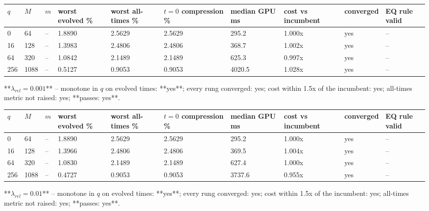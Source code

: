 \documentclass[11pt]{article}
\begin{document}
\begin{table}[htbp]\centering\small
\begin{tabular}{llllllllll}\hline
$q$ & $M$ & $m$ & worst evolved \% & worst all-times \% & $t=0$ compression \% & median GPU ms & cost vs incumbent & converged & EQ rule valid \\ \hline
0 & 64 & -- & 1.8890 & 2.5629 & 2.5629 & 295.2 & 1.000x & yes & -- \\
16 & 128 & -- & 1.3983 & 2.4806 & 2.4806 & 368.7 & 1.002x & yes & -- \\
64 & 320 & -- & 1.0842 & 2.1489 & 2.1489 & 625.3 & 0.997x & yes & -- \\
256 & 1088 & -- & 0.5127 & 0.9053 & 0.9053 & 4020.5 & 1.028x & yes & -- \\
\hline\end{tabular}
\end{table}
**$\lambda_{rel} = 0.001$** -- monotone in $q$ on evolved times: **yes**; every rung converged: yes; cost within 1.5x of the incumbent: yes; all-times metric not raised: yes; **passes: yes**.

\begin{table}[htbp]\centering\small
\begin{tabular}{llllllllll}\hline
$q$ & $M$ & $m$ & worst evolved \% & worst all-times \% & $t=0$ compression \% & median GPU ms & cost vs incumbent & converged & EQ rule valid \\ \hline
0 & 64 & -- & 1.8890 & 2.5629 & 2.5629 & 295.2 & 1.000x & yes & -- \\
16 & 128 & -- & 1.3966 & 2.4806 & 2.4806 & 369.5 & 1.004x & yes & -- \\
64 & 320 & -- & 1.0830 & 2.1489 & 2.1489 & 627.4 & 1.000x & yes & -- \\
256 & 1088 & -- & 0.4727 & 0.9053 & 0.9053 & 3737.6 & 0.955x & yes & -- \\
\hline\end{tabular}
\end{table}
**$\lambda_{rel} = 0.01$** -- monotone in $q$ on evolved times: **yes**; every rung converged: yes; cost within 1.5x of the incumbent: yes; all-times metric not raised: yes; **passes: yes**.
\end{document}
